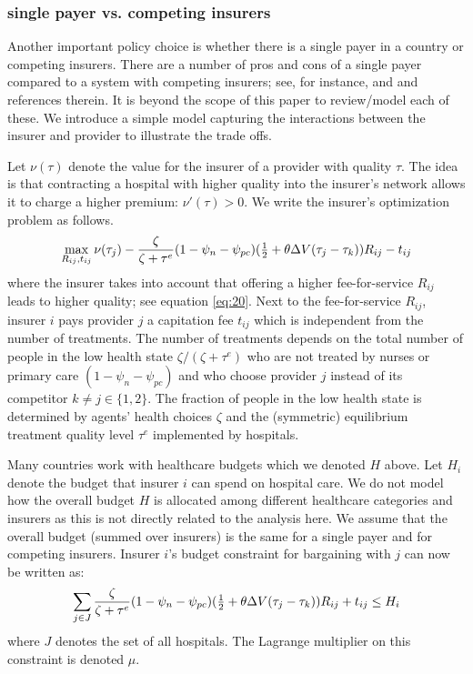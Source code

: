 \documentclass[a4paper,12pt]{article}
\begin{document}
\subsubsection{single payer vs. competing insurers}
\label{sec:orgdd2dd44}

Another important policy choice is whether there is a single payer in a country or competing insurers. There are a number of pros and cons of a single payer compared to a system with competing insurers; see, for instance, \cite{OberlanderSinglePayer} and \cite{BICHAY2020113454} and references therein. It is beyond the scope of this paper to review/model each of these. We introduce a simple model capturing the interactions between the insurer and provider to illustrate the trade offs.

Let \(\nu(\tau)\) denote the value for the insurer of a provider with quality \(\tau\). The idea is that contracting a hospital with higher quality into the insurer's network allows it to charge a higher premium: \(\nu'(\tau) > 0\). We write the insurer's optimization problem as follows.
\begin{equation}
\label{eq:36a}
\max_{R_{ij},t_{ij}} \nu(\tau_j) - \frac{\zeta}{\zeta+\tau^e}(1-\psi_n-\psi_{pc}) (\textstyle{1\over 2}+\theta\Delta V(\tau_j-\tau_k) )R_{ij} - t_{ij}
\end{equation}
where the insurer takes into account that offering a higher fee-for-service \(R_{ij}\) leads to higher quality; see equation \eqref{eq:20}. Next to the fee-for-service \(R_{ij}\), insurer \(i\) pays provider \(j\) a capitation fee \(t_{ij}\) which is independent from the number of treatments. The number of treatments depends on the total number of people in the low health state \(\zeta/(\zeta+\tau^e)\) who are not treated by nurses or primary care \((1-\psi_n-\psi_{pc})\) and who choose provider \(j\) instead of its competitor \(k \neq j \in \{1,2\}\). The fraction of people in the low health state is determined by agents' health choices \(\zeta\) and the (symmetric) equilibrium treatment quality level \(\tau^e\) implemented by hospitals.

Many countries work with healthcare budgets which we denoted \(H\) above. Let \(H_i\) denote the budget that insurer \(i\) can spend on hospital care. We do not model how the overall budget \(H\) is allocated among different healthcare categories and insurers as this is not directly related to the analysis here. We assume that the overall budget (summed over insurers) is the same for a single payer and for competing insurers. Insurer \(i\)'s budget constraint for bargaining with \(j\) can now be written as:
\begin{equation}
\label{eq:35}
\sum_{j \in J} \frac{\zeta}{\zeta+\tau^e}(1-\psi_n-\psi_{pc}) (\textstyle{1\over 2}+\theta\Delta V(\tau_j-\tau_k) )R_{ij} + t_{ij} \leq H_i
\end{equation}
where \(J\) denotes the set of all hospitals. The Lagrange multiplier on this constraint is denoted \(\mu\).
\end{document}
